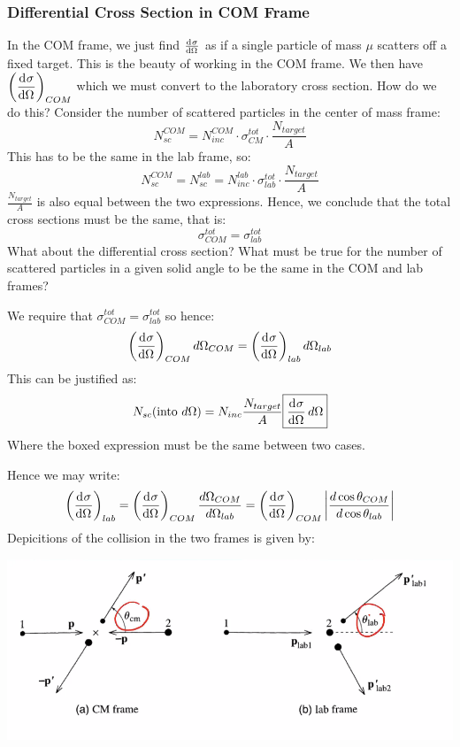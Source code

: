 \subsubsection{Differential Cross Section in COM Frame}
In the COM frame, we just find $\od{\sigma}{\Omega}$ as if a single particle of mass $\mu$ scatters off a fixed target. This is the beauty of working in the COM frame. We then have $\left(\dod{\sigma}{\Omega}\right)_{COM}$ which we must convert to the laboratory cross section. How do we do this? Consider the number of scattered particles in the center of mass frame: \[N_{sc}^{COM} = N_{inc}^{COM}\cdot \sigma_{CM}^{tot} \cdot \frac{N_{target}}{A}\]
This has to be the same in the lab frame, so:
\[N_{sc}^{COM} = N_{sc}^{lab} = N_{inc}^{lab}\cdot \sigma_{lab}^{tot}\cdot \frac{N_{target}}{A}\]
$\frac{N_{target}}{A}$ is also equal between the two expressions. Hence, we conclude that the total cross sections must be the same, that is:
\[\sigma_{COM}^{tot} = \sigma_{lab}^{tot}\]
What about the differential cross section? What must be true for the number of scattered particles in a given solid angle to be the same in the COM and lab frames?
\begin{s}
We require that $\sigma_{COM}^{tot} = \sigma_{lab}^{tot}$ so hence:
\[\left(\dod{\sigma}{\Omega}\right)_{COM}d\Omega_{COM} = \left(\dod{\sigma}{\Omega}\right)_{lab}d\Omega_{lab}\]
This can be justified as:
\[N_{sc}(\text{into $d\Omega$}) = N_{inc}\frac{N_{target}}{A}\boxed{\dod{\sigma}{\Omega}d\Omega}\]
Where the boxed expression must be the same between two cases.
\end{s}
Hence we may write:
\[\left(\dod{\sigma}{\Omega}\right)_{lab} = \left(\dod{\sigma}{\Omega}\right)_{COM} \frac{d\Omega_{COM}}{d\Omega_{lab}} = \left(\dod{\sigma}{\Omega}\right)_{COM}\abs{\frac{d\cos\theta_{COM}}{d\cos\theta_{lab}}}\]
Depicitions of the collision in the two frames is given by:
\begin{center}
    \includegraphics[scale=0.5]{Lecture-29/l29-img3.png}
\end{center}
